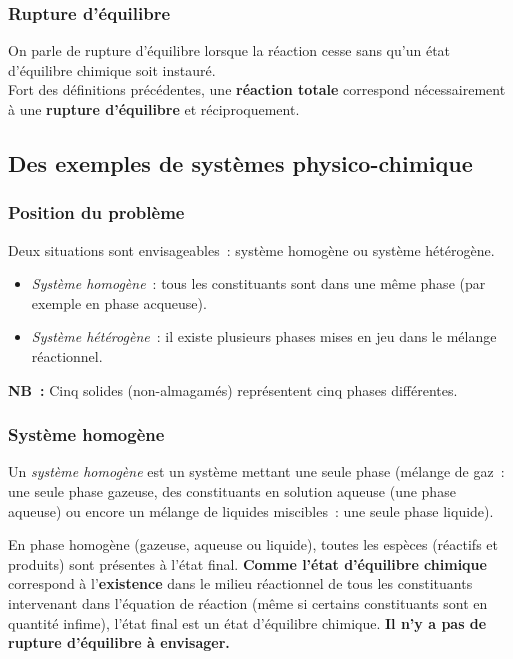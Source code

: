 \documentclass{article}
\begin{document}
\subsubsection{Rupture d'équilibre}
On parle de rupture d’équilibre lorsque la réaction cesse sans qu’un état d’équilibre chimique soit instauré.\\
Fort des définitions précédentes, une \textbf{réaction totale} correspond nécessairement à une \textbf{rupture d’équilibre} et réciproquement.


\subsection{Des exemples de systèmes physico-chimique}
\subsubsection{Position du problème}

    Deux situations sont envisageables~: système homogène ou système hétérogène.
\begin{tableau}
    \begin{itemize}
    \item \textit{Système homogène}~: tous les constituants sont dans une même phase (par exemple en phase acqueuse).
    \item \textit{Système hétérogène}~: il existe plusieurs phases mises en jeu dans le mélange réactionnel.
\end{itemize}
\textbf{NB~:} Cinq solides (non-almagamés) représentent cinq phases différentes.
\end{tableau}

\subsubsection{Système homogène}
\begin{enonce}
    Un \textit{système homogène} est un système mettant une seule phase (mélange de gaz~: une seule phase gazeuse, des constituants en solution aqueuse (une phase aqueuse) ou encore un mélange de liquides miscibles~: une seule phase liquide).
\end{enonce}
En phase homogène (gazeuse, aqueuse ou liquide), toutes les espèces (réactifs et produits) sont présentes à l’état final. \textbf{Comme l’état d’équilibre chimique} correspond à l’\textbf{existence} dans le milieu réactionnel de tous les constituants intervenant dans l’équation de réaction (même si certains constituants sont en quantité infime), l’état final est un état d’équilibre chimique. \textbf{Il n’y a pas de rupture d’équilibre à envisager.}
\end{document}
